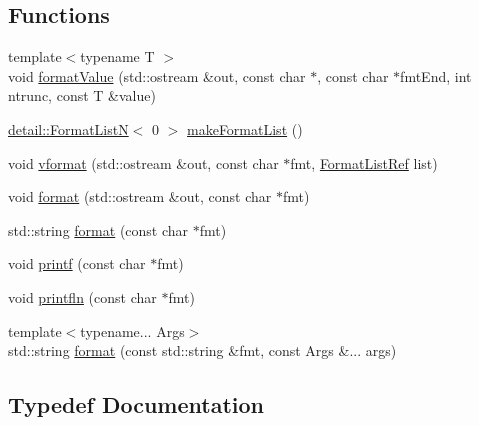 \subsection*{Functions}
\begin{DoxyCompactItemize}
\item 
{\footnotesize template$<$typename T $>$ }\\void \mbox{\hyperlink{namespacetinyformat_a875b4e4f642b74394598804a1b012f9d}{format\+Value}} (std\+::ostream \&out, const char $\ast$, const char $\ast$fmt\+End, int ntrunc, const T \&value)
\item 
\mbox{\hyperlink{classtinyformat_1_1detail_1_1_format_list_n}{detail\+::\+Format\+ListN}}$<$ 0 $>$ \mbox{\hyperlink{namespacetinyformat_ab7b10973ec89e6601353675a85f99d61}{make\+Format\+List}} ()
\item 
void \mbox{\hyperlink{namespacetinyformat_a86ed74eb3ed66a662e96220d877da964}{vformat}} (std\+::ostream \&out, const char $\ast$fmt, \mbox{\hyperlink{namespacetinyformat_ac2ce88095d287d22004006ed25117e0e}{Format\+List\+Ref}} list)
\item 
void \mbox{\hyperlink{namespacetinyformat_adc3e74768f0e2204f9f9a726fc07ec61}{format}} (std\+::ostream \&out, const char $\ast$fmt)
\item 
std\+::string \mbox{\hyperlink{namespacetinyformat_ae1b86cf888437f4c64856a1da1f7447b}{format}} (const char $\ast$fmt)
\item 
void \mbox{\hyperlink{namespacetinyformat_a970fd8292e14eb74ba55bafb41017016}{printf}} (const char $\ast$fmt)
\item 
void \mbox{\hyperlink{namespacetinyformat_a97775445fea05ffaaa0690ab3bb1a920}{printfln}} (const char $\ast$fmt)
\item 
{\footnotesize template$<$typename... Args$>$ }\\std\+::string \mbox{\hyperlink{namespacetinyformat_a8cc0453726f12eef65695df89b872336}{format}} (const std\+::string \&fmt, const Args \&... args)
\end{DoxyCompactItemize}


\subsection{Typedef Documentation}
\mbox{\label{namespacetinyformat_ac2ce88095d287d22004006ed25117e0e}} 
